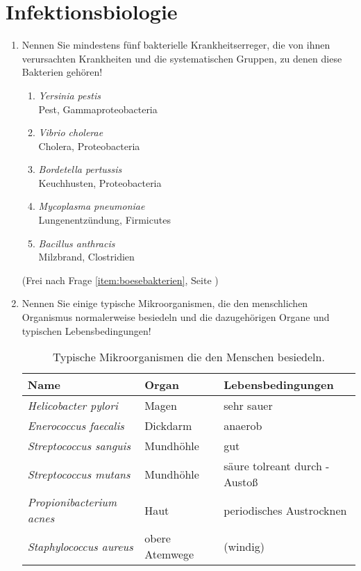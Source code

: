 
\section{Infektionsbiologie}
\begin{enumerate}
	\item Nennen Sie mindestens fünf bakterielle Krankheitserreger, die von ihnen verursachten Krankheiten und die systematischen Gruppen, zu denen diese Bakterien gehören!

	\begin{enumerate}[label=\arabic*)]
		\item \emph{Yersinia pestis} \hfill \\
			Pest, Gammaproteobacteria
		\item \emph{Vibrio cholerae} \hfill \\
			Cholera, Proteobacteria
		\item \emph{Bordetella pertussis} \hfill \\
			Keuchhusten, Proteobacteria
		\item \emph{Mycoplasma pneumoniae} \hfill \\
			Lungenentzündung, Firmicutes
		\item \emph{Bacillus anthracis} \hfill \\
			Milzbrand, Clostridien
	\end{enumerate}

	(Frei nach Frage \ref{item:boesebakterien}, Seite \pageref{item:boesebakterien})

	\item Nennen Sie einige typische Mikroorganismen, die den menschlichen Organismus normalerweise besiedeln und die dazugehörigen Organe und typischen Lebensbedingungen!

		\begin{table}[h!]
		\begin{center}
		\begin{tabular}{l l l} 
		\toprule
		Name 				&	Organ				& 	Lebensbedingungen	\\
		\midrule
		\emph{Helicobacter pylori}		&	Magen			&	sehr sauer		\\
		\emph{Enerococcus faecalis	}	&	Dickdarm		&	anaerob		\\
		\emph{Streptococcus sanguis}	&	Mundhöhle	&	gut		\\
		\emph{Streptococcus mutans}	&	Mundhöhle	&	säure tolreant durch \ce{H+}-Austoß		\\
		\emph{Propionibacterium acnes}&	Haut			&	periodisches Austrocknen	\\
		\emph{Staphylococcus aureus}	&	obere Atemwege	&	(windig)		\\
		\bottomrule
		\end{tabular}
		\caption{Typische Mikroorganismen die den Menschen besiedeln.}
		\label{tab:meinemitbewohneraufmir}
		\end{center}
		\end{table}


\end{enumerate}
